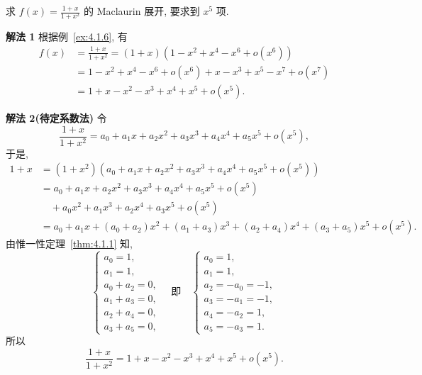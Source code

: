 \begin{example}\label{ex:4.1.12}
求 $f(x)=\frac{1+x}{1+x^{2}}$ 的 Maclaurin 展开, 要求到 $x^{5}$ 项.
\end{example}

\begin{solution}
\textbf{解法 1} 根据例~\ref{ex:4.1.6}, 有
\begin{align*}
f(x)&=\frac{1+x}{1+x^{2}}=(1+x)(1-x^{2}+x^{4}-x^{6}+o(x^{6}))\\
&=1-x^{2}+x^{4}-x^{6}+o(x^{6})+x-x^{3}+x^{5}-x^{7}+o(x^{7})\\
&=1+x-x^{2}-x^{3}+x^{4}+x^{5}+o(x^{5}).
\end{align*}

\textbf{解法 2(待定系数法)} 令
\[
\frac{1+x}{1+x^{2}}=a_{0}+a_{1}x+a_{2}x^{2}+a_{3}x^{3}+a_{4}x^{4}+a_{5}x^{5}+o(x^{5}),
\]
于是,
\begin{align*}
1+x&=(1+x^{2})(a_{0}+a_{1}x+a_{2}x^{2}+a_{3}x^{3}+a_{4}x^{4}+a_{5}x^{5}+o(x^{5}))\\
&=a_{0}+a_{1}x+a_{2}x^{2}+a_{3}x^{3}+a_{4}x^{4}+a_{5}x^{5}+o(x^{5})\\
&\quad+a_{0}x^{2}+a_{1}x^{3}+a_{2}x^{4}+a_{3}x^{5}+o(x^{5})\\
&=a_{0}+a_{1}x+(a_{0}+a_{2})x^{2}+(a_{1}+a_{3})x^{3}+(a_{2}+a_{4})x^{4}+(a_{3}+a_{5})x^{5}+o(x^{5}).
\end{align*}
由惟一性定理~\ref{thm:4.1.1} 知,
\[
\begin{cases}
a_{0}=1,\\
a_{1}=1,\\
a_{0}+a_{2}=0,\\
a_{1}+a_{3}=0,\\
a_{2}+a_{4}=0,\\
a_{3}+a_{5}=0,
\end{cases}\quad \text{即}\quad
\begin{cases}
a_{0}=1,\\
a_{1}=1,\\
a_{2}=-a_{0}=-1,\\
a_{3}=-a_{1}=-1,\\
a_{4}=-a_{2}=1,\\
a_{5}=-a_{3}=1.
\end{cases}
\]
所以
\[
\frac{1+x}{1+x^{2}}=1+x-x^{2}-x^{3}+x^{4}+x^{5}+o(x^{5}).
\]


\end{solution}
